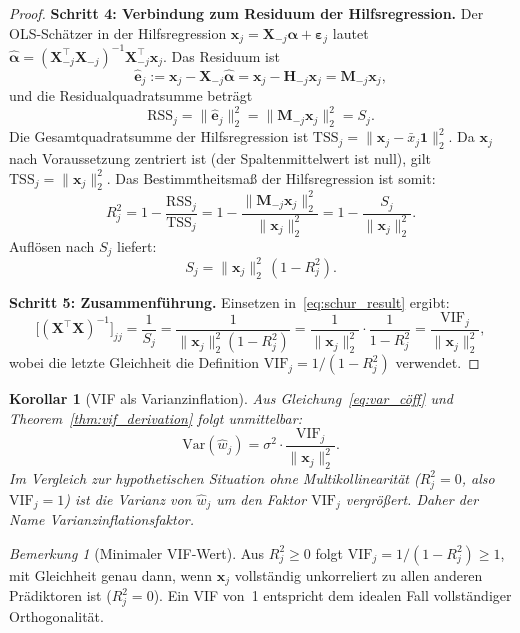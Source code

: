 ﻿\documentclass[12pt, a4paper]{article}
\newtheorem{corollary}[theorem]{Korollar}
\theoremstyle{definition}
\theoremstyle{remark}
\newtheorem{remark}[theorem]{Bemerkung}
\newcommand{\vx}{\bm{x}}
\newcommand{\vX}{\bm{X}}
\newcommand{\T}{\top}
\begin{document}
\begin{proof}
	\textbf{Schritt 4: Verbindung zum Residuum der Hilfsregression.}
	Der OLS-Schätzer in der Hilfsregression $\vx_j = \vX_{-j}\bm{\alpha} + \bm{\varepsilon}_j$
	lautet $\hat{\bm{\alpha}} = (\vX_{-j}^\T\vX_{-j})^{-1}\vX_{-j}^\T\vx_j$. Das Residuum ist
	\[
	\hat{\bm{e}}_j := \vx_j - \vX_{-j}\hat{\bm{\alpha}}
	= \vx_j - \bm{H}_{-j}\vx_j = \bm{M}_{-j}\vx_j,
	\]
	und die Residualquadratsumme beträgt
	\[
	\mathrm{RSS}_j = \|\hat{\bm{e}}_j\|_2^2 = \|\bm{M}_{-j}\vx_j\|_2^2 = S_j.
	\]
	Die Gesamtquadratsumme der Hilfsregression ist $\mathrm{TSS}_j = \|\vx_j - \bar{x}_j\bm{1}\|_2^2$.
	Da $\vx_j$ nach Voraussetzung zentriert ist (der Spaltenmittelwert ist null), gilt
	$\mathrm{TSS}_j = \|\vx_j\|_2^2$. Das Bestimmtheitsmaß der Hilfsregression ist somit:
	\[
	R_j^2 = 1 - \frac{\mathrm{RSS}_j}{\mathrm{TSS}_j}
	= 1 - \frac{\|\bm{M}_{-j}\vx_j\|_2^2}{\|\vx_j\|_2^2}
	= 1 - \frac{S_j}{\|\vx_j\|_2^2}.
	\]
	Auflösen nach $S_j$ liefert:
	\[
	S_j = \|\vx_j\|_2^2\,(1 - R_j^2).
	\]

	\textbf{Schritt 5: Zusammenführung.}
	Einsetzen in~\eqref{eq:schur_result} ergibt:
	\[
	\bigl[(\vX^\T\vX)^{-1}\bigr]_{jj}
	= \frac{1}{S_j}
	= \frac{1}{\|\vx_j\|_2^2(1 - R_j^2)}
	= \frac{1}{\|\vx_j\|_2^2} \cdot \frac{1}{1-R_j^2}
	= \frac{\mathrm{VIF}_j}{\|\vx_j\|_2^2},
	\]
	wobei die letzte Gleichheit die Definition $\mathrm{VIF}_j = 1/(1-R_j^2)$ verwendet.
\end{proof}

\begin{corollary}[VIF als Varianzinflation]
	\label{cor:vif_inflation}
	Aus Gleichung~\eqref{eq:var_cöff} und Theorem~\ref{thm:vif_derivation} folgt unmittelbar:
	\begin{equation}
		\mathrm{Var}(\hat{w}_j) = \sigma^2 \cdot \frac{\mathrm{VIF}_j}{\|\vx_j\|_2^2}.
		\label{eq:var_inflated}
	\end{equation}
	Im Vergleich zur hypothetischen Situation ohne Multikollinearität ($R_j^2 = 0$, also $\mathrm{VIF}_j = 1$)
	ist die Varianz von $\hat{w}_j$ um den Faktor $\mathrm{VIF}_j$ vergrößert. Daher der Name
	\emph{Varianzinflationsfaktor}.
\end{corollary}

\begin{remark}[Minimaler VIF-Wert]
	Aus $R_j^2 \geq 0$ folgt $\mathrm{VIF}_j = 1/(1-R_j^2) \geq 1$, mit Gleichheit genau dann,
	wenn $\vx_j$ vollständig unkorreliert zu allen anderen Prädiktoren ist ($R_j^2 = 0$).
	Ein VIF von~1 entspricht dem idealen Fall vollständiger Orthogonalität.
\end{remark}
\end{document}
